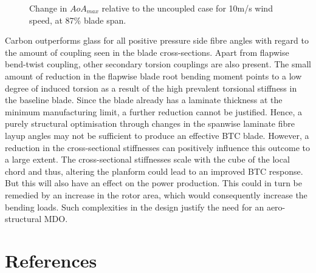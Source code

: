 \documentclass[a4paper]{jpconf}
\begin{document}
\begin{figure}[pth]
\begin{minipage}{0.45\textwidth}
\caption{\label{subfig:alphacurve_rel}Change in $AoA_{max}$ relative to the uncoupled case for 10m/s wind speed, at 87\% blade span.}
\end{minipage} 
\end{figure}

 Carbon outperforms glass for all positive pressure side fibre angles with regard to the amount of coupling seen in the blade cross-sections. Apart from flapwise bend-twist coupling, other secondary torsion couplings are also present. The small amount of reduction in the flapwise blade root bending moment points to a low degree of induced torsion as a result of the high prevalent torsional stiffness in the baseline blade. Since the blade already has a laminate thickness at the minimum manufacturing limit, a further reduction cannot be justified. Hence, a purely structural optimisation through changes in the spanwise laminate fibre layup angles may not be sufficient to produce an effective BTC blade. However, a reduction in the cross-sectional stiffnesses can positively influence this outcome to a large extent. The cross-sectional stiffnesses scale with the cube of the local chord and thus, altering the planform could lead to an improved BTC response. But this will also have an effect on the power production. This could in turn be remedied by an increase in the rotor area, which would consequently increase the bending loads. Such complexities in the design justify the need for an aero-structural MDO.    

\section*{References}


\end{document}
